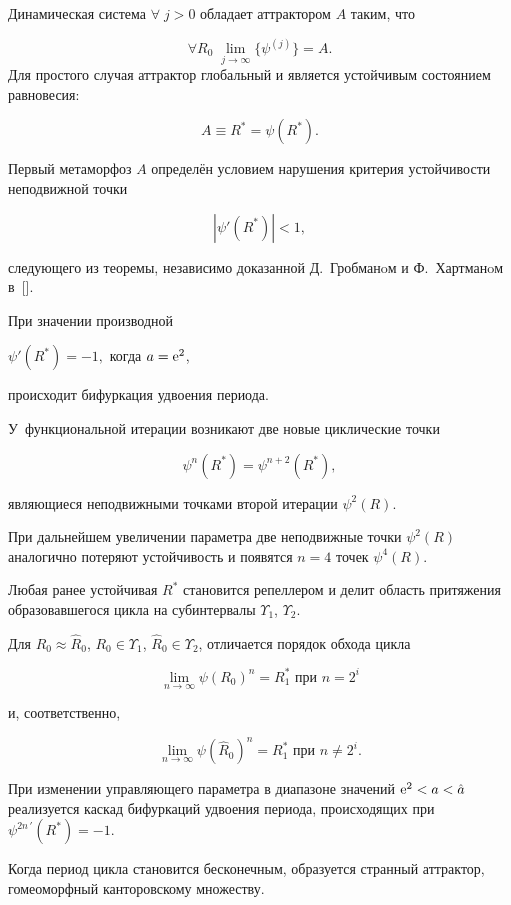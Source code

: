 Динамическая система  $\forall\; j>0$ обладает аттрактором $A$ таким, что

$$

\forall R_0 \; \lim_{j\rightarrow\infty}{\{\psi ^{(j)}\}}=A.

$$ Для простого случая аттрактор глобальный и является устойчивым состоянием равновесия: 

$$A\equiv  R^*=\psi (R^*).$$ 

Первый метаморфоз $A$ определён условием нарушения критерия устойчивости неподвижной точки 

$$|\psi'(R^*)|<1,$$ 

следующего из теоремы,  независимо доказанной Д.~Гробманoм и Ф.~Хартманoм в~[]. 

При значении производной 

$\psi '(R^*)= -1,$ когда $a={\rm e}^2$, 

происходит бифуркация удвоения периода. 

У~функциональной итерации возникают две новые циклические точки 

$$\psi ^n (R^* )=\psi ^{n+2}(R^* ),$$ 

являющиеся неподвижными точками второй итерации $\psi ^2 (R).$ 

При дальнейшем увеличении параметра две неподвижные точки $\psi ^2 (R)$ аналогично потеряют устойчивость и появятся $n=4$ точек $\psi ^4(R).$ 

Любая ранее устойчивая $R^*$ становится репеллером и делит область притяжения образовавшегося цикла на субинтервалы $\Upsilon _1$, $\Upsilon _2$. 

Для $R_0\approx\widehat R_0$, $R_0\in \Upsilon _1$, $\widehat R_0\in \Upsilon _2$, отличается порядок обхода цикла 

$$\displaystyle{\lim_ {n\to \infty}}{\psi (R_0)^n=R^*_1} \text{ при } n=2^i$$ 

и, соответственно, 

$$\displaystyle{\lim_{n\to \infty}}{\psi (\widehat R_0)^n=R^*_1} \text{ при } n\neq 2^i.$$ 



При изменении управляющего параметра в диапазоне значений ${\rm e^2}<a<\hat a$ реализуется каскад бифуркаций удвоения периода, происходящих при \linebreak $\psi ^{2n\,\prime}(R^* )=-1.$





Когда период цикла становится бесконечным, образуется странный аттрактор, гомеоморфный канторовскому множеству. 

